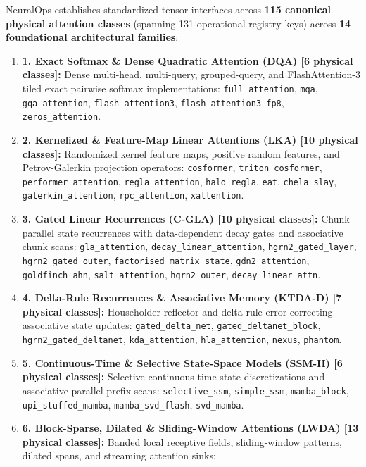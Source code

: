 \documentclass{article}
\begin{document}
NeuralOps establishes standardized tensor interfaces across \textbf{115 canonical physical attention classes} (spanning 131 operational registry keys) across \textbf{14 foundational architectural families}:
\begin{enumerate}
    \item \textbf{1. Exact Softmax \& Dense Quadratic Attention (DQA) [6 physical classes]:} Dense multi-head, multi-query, grouped-query, and FlashAttention-3 tiled exact pairwise softmax implementations:
    \texttt{full\_attention}, \texttt{mqa}, \texttt{gqa\_attention}, \texttt{flash\_attention3}, \texttt{flash\_attention3\_fp8}, \texttt{zeros\_attention}.
    \item \textbf{2. Kernelized \& Feature-Map Linear Attentions (LKA) [10 physical classes]:} Randomized kernel feature maps, positive random features, and Petrov-Galerkin projection operators:
    \texttt{cosformer}, \texttt{triton\_cosformer}, \texttt{performer\_attention}, \texttt{regla\_attention}, \texttt{halo\_regla}, \texttt{eat}, \texttt{chela\_slay}, \texttt{galerkin\_attention}, \texttt{rpc\_attention}, \texttt{xattention}.
    \item \textbf{3. Gated Linear Recurrences (C-GLA) [10 physical classes]:} Chunk-parallel state recurrences with data-dependent decay gates and associative chunk scans:
    \texttt{gla\_attention}, \texttt{decay\_linear\_attention}, \texttt{hgrn2\_gated\_layer}, \texttt{hgrn2\_gated\_outer}, \texttt{factorised\_matrix\_state}, \texttt{gdn2\_attention}, \texttt{goldfinch\_ahn}, \texttt{salt\_attention}, \texttt{hgrn2\_outer}, \texttt{decay\_linear\_attn}.
    \item \textbf{4. Delta-Rule Recurrences \& Associative Memory (KTDA-D) [7 physical classes]:} Householder-reflector and delta-rule error-correcting associative state updates:
    \texttt{gated\_delta\_net}, \texttt{gated\_deltanet\_block}, \texttt{hgrn2\_gated\_deltanet}, \texttt{kda\_attention}, \texttt{hla\_attention}, \texttt{nexus}, \texttt{phantom}.
    \item \textbf{5. Continuous-Time \& Selective State-Space Models (SSM-H) [6 physical classes]:} Selective continuous-time state discretizations and associative parallel prefix scans:
    \texttt{selective\_ssm}, \texttt{simple\_ssm}, \texttt{mamba\_block}, \texttt{upi\_stuffed\_mamba}, \texttt{mamba\_svd\_flash}, \texttt{svd\_mamba}.
    \item \textbf{6. Block-Sparse, Dilated \& Sliding-Window Attentions (LWDA) [13 physical classes]:} Banded local receptive fields, sliding-window patterns, dilated spans, and streaming attention sinks:

\end{enumerate}
\end{document}
